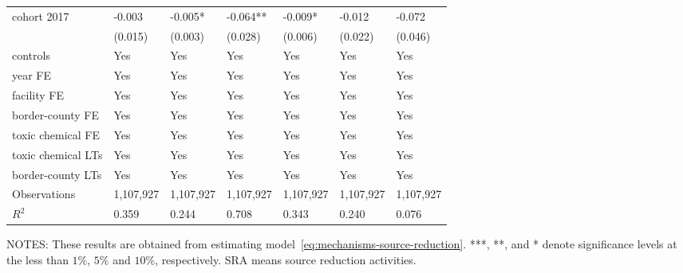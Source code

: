 \begin{table}[H]
{\begin{tabular}{@{}lllllll@{}}
            cohort 2017                 & -0.003                  & -0.005*                  & -0.064**  & -0.009*                  & -0.012                    & -0.072                      \\
            & (0.015)                 & (0.003)                  & (0.028)   & (0.006)                  & (0.022)                   & (0.046)                     \\
            controls                    & Yes                     & Yes                      & Yes       & Yes                      & Yes                       & Yes                         \\
            year FE                     & Yes                     & Yes                      & Yes       & Yes                      & Yes                       & Yes                         \\
            facility FE                 & Yes                     & Yes                      & Yes       & Yes                      & Yes                       & Yes                         \\
            border-county FE            & Yes                     & Yes                      & Yes       & Yes                      & Yes                       & Yes                         \\
            toxic chemical FE           & Yes                     & Yes                      & Yes       & Yes                      & Yes                       & Yes                         \\
            toxic chemical LTs          & Yes                     & Yes                      & Yes       & Yes                      & Yes                       & Yes                         \\
            border-county LTs           & Yes                     & Yes                      & Yes       & Yes                      & Yes                       & Yes                         \\\midrule
            Observations                & 1,107,927               & 1,107,927                & 1,107,927 & 1,107,927                & 1,107,927                 & 1,107,927                   \\
            $R^2$                       & 0.359                   & 0.244                    & 0.708     & 0.343                    & 0.240                     & 0.076                       \\ \bottomrule\bottomrule
        \end{tabular}%
    }
    \begin{minipage}{\columnwidth}
        \vspace{0.05in}
        \tiny NOTES: These results are obtained from estimating model~\ref{eq:mechanisms-source-reduction}. ***, **, and * denote significance levels at the less than $1\%$, $5\%$ and $10\%$, respectively. SRA means source reduction activities.
    \end{minipage}
\end{table}